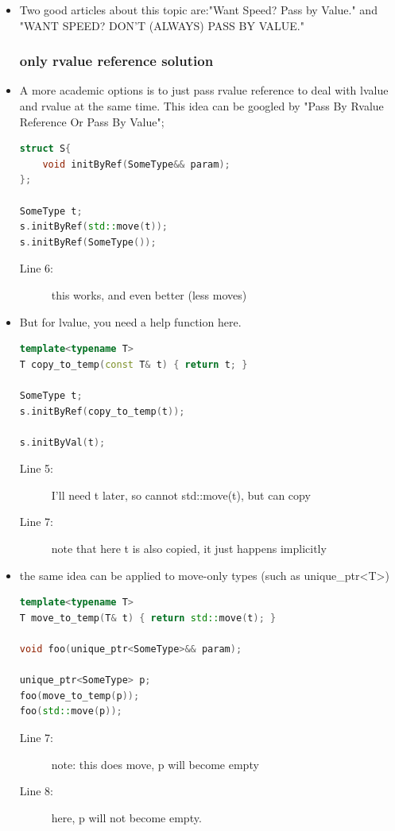 \documentclass[a4paper,11pt,twoside]{book}
\begin{document}
\begin{itemize}
\item Two good articles about this topic are:"Want Speed? Pass by Value." and "WANT SPEED? DON'T (ALWAYS) PASS BY VALUE."

\subsubsection{only rvalue  reference solution}
\item A more academic options is to just pass rvalue  reference to deal with lvalue and rvalue at the same time. This idea can be googled by "Pass By Rvalue Reference Or Pass By Value";
\begin{lstlisting}[frame=single, language=c++]
struct S{
    void initByRef(SomeType&& param);
};

SomeType t;
s.initByRef(std::move(t)); 
s.initByRef(SomeType()); 
\end{lstlisting}
\begin{description}
	\item[Line 6:] this works, and even better (less moves)
\end{description}

\item But for lvalue, you need a help function here.
\begin{lstlisting}[frame=single, language=c++]
template<typename T>
T copy_to_temp(const T& t) { return t; }

SomeType t; 
s.initByRef(copy_to_temp(t)); 

s.initByVal(t); 
\end{lstlisting}
\begin{description}
	\item[Line 5:] I'll need t later, so cannot std::move(t), but can copy
	\item[Line 7:] note that here t is also copied, it just happens implicitly
\end{description}

\item the same idea can be applied to move-only types (such as unique\_ptr<T>)
\begin{lstlisting}[frame=single, language=c++]
template<typename T>
T move_to_temp(T& t) { return std::move(t); }

void foo(unique_ptr<SomeType>&& param);

unique_ptr<SomeType> p;
foo(move_to_temp(p)); 
foo(std::move(p)); 
\end{lstlisting}
\begin{description}
	\item[Line 7:] note: this does move, p will become empty
	\item[Line 8:] here, p will not become empty. 
\end{description}



\end{itemize}
\end{document}

